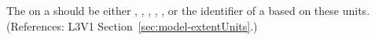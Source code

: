 The  on a \Model should be either ,
 , , , ,
 or the identifier of a \UnitDefinition based
on these units.  (References: L3V1 Section~\ref{sec:model-extentUnits}.)
